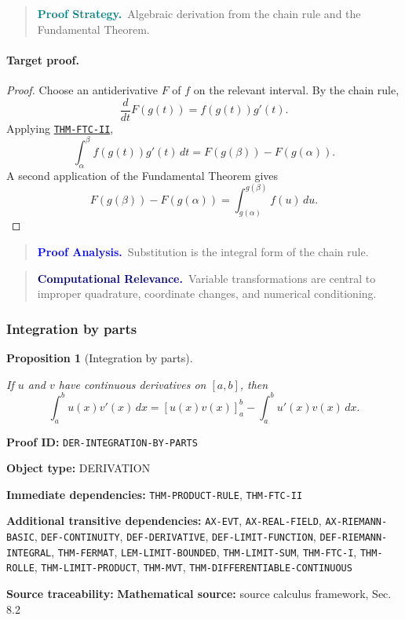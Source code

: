 \documentclass[10pt]{article}
\newcommand{\pidraw}[1]{\begingroup\urlstyle{tt}\nolinkurl{#1}\endgroup}
\newcommand{\pidref}[1]{\hyperref[prf:#1]{\pidraw{#1}}}
\newcommand{\pid}[1]{\pidref{#1}}
\newtheorem{proposition}[theorem]{Proposition}
\theoremstyle{definition}
\theoremstyle{remark}
\newenvironment{proofstrategy}
{\begin{quote}\small\noindent\textbf{\textcolor{teal}{Proof Strategy.}}\ }
{\end{quote}}
\newenvironment{proofanalysis}
{\begin{quote}\small\noindent\textbf{\textcolor{blue}{Proof Analysis.}}\ }
{\end{quote}}
\newenvironment{computationalrelevance}
{\begin{quote}\small\noindent\textbf{\textcolor{navy}{Computational Relevance.}}\ }
{\end{quote}}
\newcommand{\meta}[2]{\noindent\textbf{#1:} #2\par}
\begin{document}
\begin{proofstrategy}Algebraic derivation from the chain rule and the Fundamental Theorem.\end{proofstrategy}

\paragraph{Target proof.}

\begin{proof}

Choose an antiderivative $F$ of $f$ on the relevant interval. By the chain rule,
\[
\frac{d}{dt}F(g(t))=f(g(t))g'(t).
\]
Applying \pid{THM-FTC-II},
\[
\int_\alpha^\beta f(g(t))g'(t)\,dt
=F(g(\beta))-F(g(\alpha)).
\]
A second application of the Fundamental Theorem gives
\[
F(g(\beta))-F(g(\alpha))
=\int_{g(\alpha)}^{g(\beta)} f(u)\,du.
\]

\end{proof}

\begin{proofanalysis}Substitution is the integral form of the chain rule.\end{proofanalysis}

\begin{computationalrelevance}Variable transformations are central to improper quadrature, coordinate changes, and numerical conditioning.\end{computationalrelevance}

\subsubsection{Integration by parts}

\begin{proposition}[Integration by parts]\label{prf:DER-INTEGRATION-BY-PARTS}

If $u$ and $v$ have continuous derivatives on $[a,b]$, then
\[
\int_a^b u(x)v'(x)\,dx
=
[u(x)v(x)]_a^b-\int_a^b u'(x)v(x)\,dx.
\]

\end{proposition}

\meta{Proof ID}{\pidraw{DER-INTEGRATION-BY-PARTS}}
\meta{Object type}{DERIVATION}
\meta{Immediate dependencies}{\pidraw{THM-PRODUCT-RULE}, \pidraw{THM-FTC-II}}
\meta{Additional transitive dependencies}{\pidraw{AX-EVT}, \pidraw{AX-REAL-FIELD}, \pidraw{AX-RIEMANN-BASIC}, \pidraw{DEF-CONTINUITY}, \pidraw{DEF-DERIVATIVE}, \pidraw{DEF-LIMIT-FUNCTION}, \pidraw{DEF-RIEMANN-INTEGRAL}, \pidraw{THM-FERMAT}, \pidraw{LEM-LIMIT-BOUNDED}, \pidraw{THM-LIMIT-SUM}, \pidraw{THM-FTC-I}, \pidraw{THM-ROLLE}, \pidraw{THM-LIMIT-PRODUCT}, \pidraw{THM-MVT}, \pidraw{THM-DIFFERENTIABLE-CONTINUOUS}}
\meta{Source traceability}{\textbf{Mathematical source:} source calculus framework, Sec. 8.2}
\end{document}
